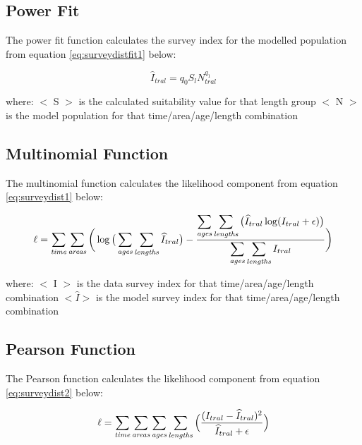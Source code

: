 \documentclass[]{book}
\begin{document}
\hypertarget{power-fit}{%
\subsection{Power Fit}\label{power-fit}}

The power fit function calculates the survey index for the modelled
population from
equation \eqref{eq:surveydistfit1} below:

\begin{equation}
\label{eq:surveydistfit2}
\widehat{I}_{tral} = q_{0} S_{l} N_{tral} ^{q_{1}}\end{equation}

where: \(<\) S \(>\) is the calculated suitability value for that length
group \(<\) N \(>\) is the model population for that time/area/age/length
combination

\hypertarget{multinomial-function-2}{%
\subsection{Multinomial Function}\label{multinomial-function-2}}

The multinomial function calculates the likelihood component from
equation \eqref{eq:surveydist1} below:

\begin{equation}
\label{eq:surveydist1}
\ell = \sum_{\it time}\sum_{\it areas} \bigg( \log \big(\sum_{\it ages}\sum_{\it lengths} \widehat{I}_{tral} \big) - {\frac { \displaystyle \sum_{\it ages}\sum_{\it lengths} \big(\widehat{I}_{tral} \log (I_{tral} + \epsilon) \big)} { \displaystyle \sum_{\it ages}\sum_{\it lengths} I_{tral}} } \bigg)\end{equation}

where: \(<\) I \(>\) is the data survey index for that time/area/age/length
combination \(<\widehat{I}>\) is the model survey index for that
time/area/age/length combination

\hypertarget{pearson-function-1}{%
\subsection{Pearson Function}\label{pearson-function-1}}

The Pearson function calculates the likelihood component from
equation \eqref{eq:surveydist2} below:

\begin{equation}
\label{eq:surveydist2}
\ell = \sum_{\it time}\sum_{\it areas}\sum_{\it ages}\sum_{\it lengths} \Big( {\frac{ ( I_{tral} - \widehat{I}_{tral} ) ^2} {\widehat{I}_{tral} + \epsilon}} \Big)\end{equation}
\end{document}
